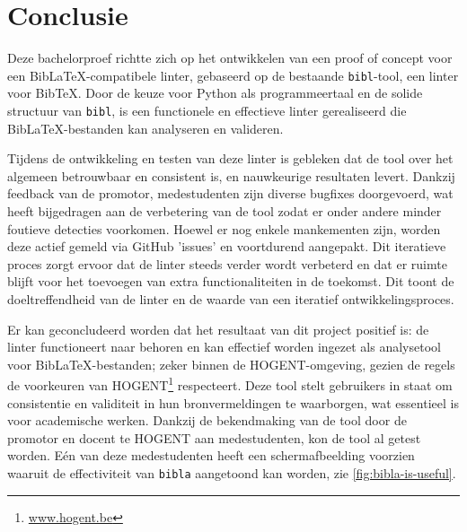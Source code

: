 
\chapter{Conclusie}%
\label{ch:conclusie}




Deze bachelorproef richtte zich op het ontwikkelen van een proof of concept voor een BibLaTeX-compatibele linter, gebaseerd op de bestaande \texttt{bibl}-tool, een linter voor BibTeX. Door de keuze voor Python als programmeertaal en de solide structuur van \texttt{bibl}, is een functionele en effectieve linter gerealiseerd die BibLaTeX-bestanden kan analyseren en valideren.

Tijdens de ontwikkeling en testen van deze linter is gebleken dat de tool over het algemeen betrouwbaar en consistent is, en nauwkeurige resultaten levert. Dankzij feedback van de promotor, medestudenten zijn diverse bugfixes doorgevoerd, wat heeft bijgedragen aan de verbetering van de tool zodat er onder andere minder foutieve detecties voorkomen. Hoewel er nog enkele mankementen zijn, worden deze actief gemeld via GitHub 'issues' en voortdurend aangepakt. Dit iteratieve proces zorgt ervoor dat de linter steeds verder wordt verbeterd en dat er ruimte blijft voor het toevoegen van extra functionaliteiten in de toekomst. Dit toont de doeltreffendheid van de linter en de waarde van een iteratief ontwikkelingsproces.

Er kan geconcludeerd worden dat het resultaat van dit project  positief is: de linter functioneert naar behoren en kan effectief worden ingezet als analysetool voor BibLaTeX-bestanden; zeker binnen de HOGENT-omgeving, gezien de regels de voorkeuren van HOGENT\footnote{\url{www.hogent.be}} respecteert. Deze tool stelt gebruikers in staat om consistentie en validiteit in hun bronvermeldingen te waarborgen, wat essentieel is voor academische werken. Dankzij de bekendmaking van de tool door de promotor en docent te HOGENT aan medestudenten, kon de tool al getest worden. Eén van deze medestudenten heeft een schermafbeelding voorzien waaruit de effectiviteit van \texttt{bibla} aangetoond kan worden, zie \ref{fig:bibla-is-useful}.

